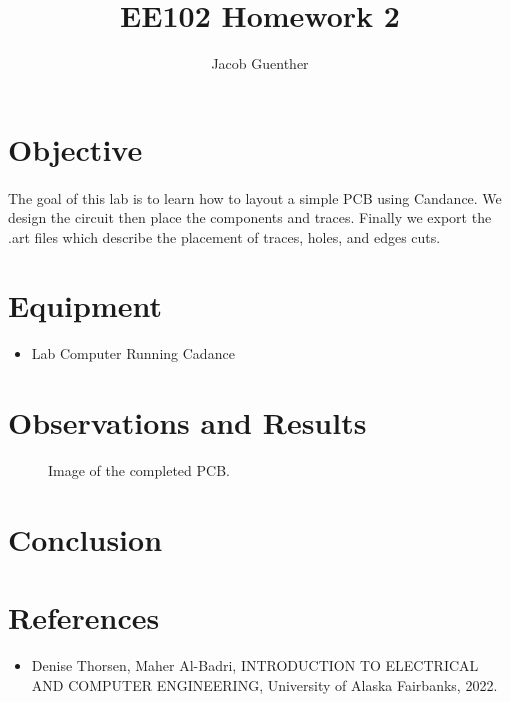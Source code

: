 \documentclass{article}
\title{EE102 Homework 2}
\author{Jacob Guenther}
\begin{document}


\section{Objective}
\paragraph{}
The goal of this lab is to learn how to layout a simple PCB using Candance. We design the circuit then place the components and traces. Finally we export the .art files which describe the placement of traces, holes, and edges cuts.

\section{Equipment}
\begin{itemize}
	\item Lab Computer Running Cadance
\end{itemize}

\section{Observations and Results}


\begin{figure}[H]
	\caption{Image of the completed PCB.}
\end{figure}


\newpage
\section{Conclusion}

\newpage
\section{References}
\begin{itemize}
	\item[\text{[1]}] Denise Thorsen, Maher Al-Badri, INTRODUCTION TO ELECTRICAL AND COMPUTER ENGINEERING, University of Alaska Fairbanks, 2022.
\end{itemize}
\end{document}
